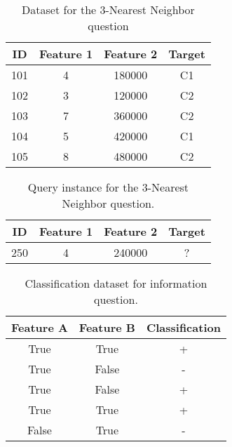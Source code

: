 \documentclass[--SOLUTION-OPTION--]{ditpaper}
\begin{document}
\newpage

\begin{table}[htdp]
\caption{Dataset for the 3-Nearest Neighbor question}
\begin{center}
\begin{tabular}{cccc}
\hline
ID & Feature 1 & Feature 2  & Target \\
\hline
101 & 4 &	180000 & C1\\
102 & 3 &	120000 & C2\\
103 & 7 &	360000 & C2\\
104 & 5 &	420000 &	C1\\
105 & 8 &	480000 &	C2\\
\hline
\end{tabular}
\end{center}
\label{tab:3nn-data}
\end{table}%

\begin{table}[htdp]
\caption{Query instance for the 3-Nearest Neighbor question.}
\begin{center}
\begin{tabular}{cccc}
\hline
ID & Feature 1 & Feature 2  & Target \\
\hline
250 & 4 &	240000 & ?\\
\hline
\end{tabular}
\end{center}
\label{tab:3nn-query}
\end{table}%


			\begin{table}[htb]
			\caption{Classification dataset for information question.}
			\label{tab:classification-data}
			\begin{center}
			\begin{tabular}{ccc}
				\hline
				Feature A & Feature B & Classification \\
				\hline
				True & True & + \\
				True & False & - \\
				True & False & + \\
				True & True & + \\
				False & True & - \\
				\hline
			\end{tabular}
			\end{center}
		\end{table}

\clearpage



\end{document}
